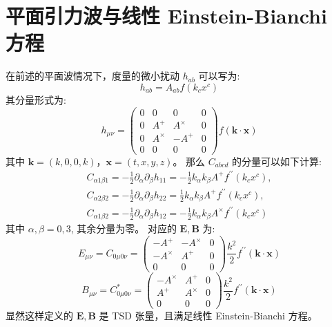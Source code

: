 \documentclass[lang=cn,a4paper,newtx]{elegantpaper}
\begin{document}
\section{平面引力波与线性 Einstein-Bianchi 方程} 
在前述的平面波情况下，度量的微小扰动 $h_{ab}$ 可以写为:
$$
h_{ab} = A_{ab}f(k_cx^c)
$$
其分量形式为:
$$
h_{\mu\nu} = 
\begin{pmatrix}
  0 & 0 & 0 & 0\\
  0 & A^{+} & A^{\times} & 0\\
  0 & A^{\times} & -A^{+} & 0\\
  0 & 0 & 0 & 0
\end{pmatrix}
f(\boldsymbol{k}\cdot\boldsymbol{x})
$$
其中 $\boldsymbol{k} = (k, 0, 0, k)$，$\boldsymbol{x} = (t, x, y, z)$。
那么 $C_{abcd}$ 的分量可以如下计算:
$$
\begin{aligned}
C_{\alpha1\beta1}=-\frac12\partial_{\alpha}\partial_{\beta}h_{11}=-\frac12k_{\alpha}k_{\beta}A^{+}f^{\prime\prime}(k_{c}x^{c}),\\C_{\alpha2\beta2}=-\frac12\partial_{\alpha}\partial_{\beta}h_{22}=\frac12k_{\alpha}k_{\beta}A^{+}f^{\prime\prime}(k_{c}x^{c}),\\C_{\alpha1\beta2}=-\frac12\partial_{\alpha}\partial_{\beta}h_{12}=-\frac12k_{\alpha}k_{\beta}A^{\times}f^{\prime\prime}(k_{c}x^{c})
\end{aligned}
$$
其中 $\alpha, \beta = 0, 3$, 其余分量为零。
对应的 $\boldsymbol{E}, \boldsymbol{B}$ 为:
$$
E_{\mu\nu} = C_{0\mu0\nu} = 
\begin{pmatrix}
    -A^{+} & -A^{\times} & 0\\
    -A^{\times} & A^{+} & 0\\
    0 & 0 & 0
\end{pmatrix}
\frac{k^2}{2}f^{\prime\prime}(\boldsymbol{k}\cdot\boldsymbol{x})
$$
$$
B_{\mu\nu} = C_{0\mu0\nu}^* =
\begin{pmatrix}
    -A^{\times} & A^{+} & 0\\
    A^{+} & A^{\times} & 0\\
    0 & 0 & 0
\end{pmatrix}
\frac{k^2}{2}f^{\prime\prime}(\boldsymbol{k}\cdot\boldsymbol{x})
$$
显然这样定义的 $\boldsymbol{E}, \boldsymbol{B}$ 是 TSD 张量，且满足线性
Einstein-Bianchi 方程。
\end{document}
